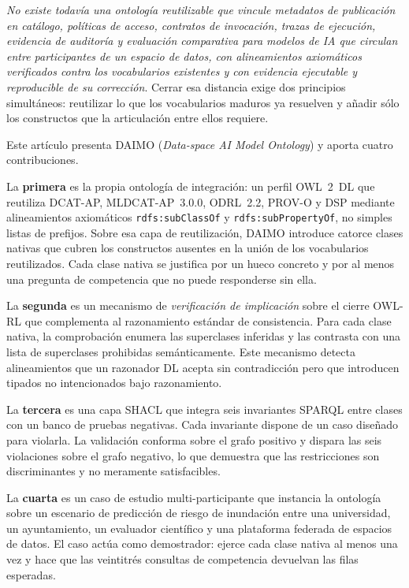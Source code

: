 \documentclass[11pt,a4paper]{article}
\newcommand{\code}[1]{\texttt{#1}}
\begin{document}
\emph{No existe todavía una ontología reutilizable que vincule metadatos de publicación en catálogo, políticas de acceso, contratos de invocación, trazas de ejecución, evidencia de auditoría y evaluación comparativa para modelos de IA que circulan entre participantes de un espacio de datos, con alineamientos axiomáticos verificados contra los vocabularios existentes y con evidencia ejecutable y reproducible de su corrección}. Cerrar esa distancia exige dos principios simultáneos: reutilizar lo que los vocabularios maduros ya resuelven y añadir sólo los constructos que la articulación entre ellos requiere.

Este artículo presenta DAIMO (\emph{Data-space AI Model Ontology}) y aporta cuatro contribuciones.

La \textbf{primera} es la propia ontología de integración: un perfil OWL~2~DL que reutiliza DCAT-AP, MLDCAT-AP~3.0.0, ODRL~2.2, PROV-O y DSP mediante alineamientos axiomáticos \code{rdfs:subClassOf} y \code{rdfs:subPropertyOf}, no simples listas de prefijos. Sobre esa capa de reutilización, DAIMO introduce catorce clases nativas que cubren los constructos ausentes en la unión de los vocabularios reutilizados. Cada clase nativa se justifica por un hueco concreto y por al menos una pregunta de competencia que no puede responderse sin ella.

La \textbf{segunda} es un mecanismo de \emph{verificación de implicación} sobre el cierre OWL-RL que complementa al razonamiento estándar de consistencia. Para cada clase nativa, la comprobación enumera las superclases inferidas y las contrasta con una lista de superclases prohibidas semánticamente. Este mecanismo detecta alineamientos que un razonador DL acepta sin contradicción pero que introducen tipados no intencionados bajo razonamiento.

La \textbf{tercera} es una capa SHACL que integra seis invariantes SPARQL entre clases con un banco de pruebas negativas. Cada invariante dispone de un caso diseñado para violarla. La validación conforma sobre el grafo positivo y dispara las seis violaciones sobre el grafo negativo, lo que demuestra que las restricciones son discriminantes y no meramente satisfacibles.

La \textbf{cuarta} es un caso de estudio multi-participante que instancia la ontología sobre un escenario de predicción de riesgo de inundación entre una universidad, un ayuntamiento, un evaluador científico y una plataforma federada de espacios de datos. El caso actúa como demostrador: ejerce cada clase nativa al menos una vez y hace que las veintitrés consultas de competencia devuelvan las filas esperadas.
\end{document}
